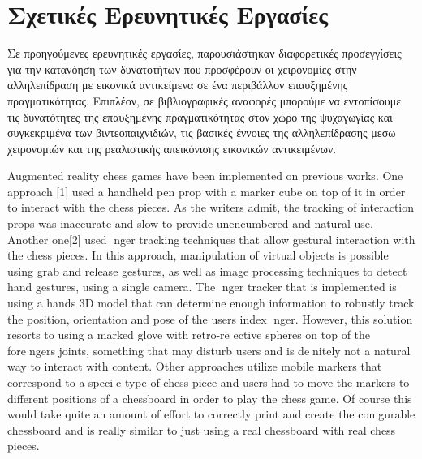

\section{Σχετικές Ερευνητικές Εργασίες}
Σε προηγούμενες ερευνητικές εργασίες, παρουσιάστηκαν διαφορετικές προσεγγίσεις για την κατανόηση των δυνατοτήτων που προσφέρουν οι χειρονομίες στην αλληλεπίδραση με εικονικά αντικείμενα σε ένα περιβάλλον επαυξημένης πραγματικότητας. Επιπλέον, σε βιβλιογραφικές αναφορές μπορούμε να εντοπίσουμε τις δυνατότητες της επαυξημένης πραγματικότητας στον χώρο της ψυχαγωγίας και συγκεκριμένα των βιντεοπαιχνιδιών, τις βασικές έννοιες της αλληλεπίδρασης μεσω χειρονομιών και της ρεαλιστικής απεικόνισης εικονικών αντικειμένων.


Augmented reality chess games have been implemented on previous works. One approach
[1] used a handheld pen prop with a marker cube on top of it in order to interact with the
chess pieces. As the writers admit, the tracking of interaction props was inaccurate and slow
to provide unencumbered and natural use. Another one[2] used nger tracking techniques that
allow gestural interaction with the chess pieces. In this approach, manipulation of virtual objects
is possible using grab and release gestures, as well as image processing techniques to detect hand
gestures, using a single camera. The nger tracker that is implemented is using a hands 3D
model that can determine enough information to robustly track the position, orientation and
pose of the users index nger. However, this solution resorts to using a marked glove with
retro-re
ective spheres on top of the forengers joints, something that may disturb users and is
denitely not a natural way to interact with content. Other approaches utilize mobile markers
that correspond to a specic type of chess piece and users had to move the markers to different
positions of a chessboard in order to play the chess game. Of course this would take quite an
amount of effort to correctly print and create the congurable chessboard and is really similar
to just using a real chessboard with real chess pieces.


